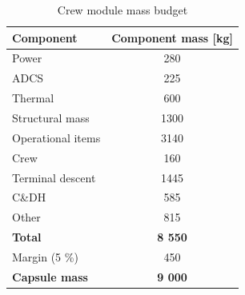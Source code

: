 \begin{table}[ht]
\centering
\caption{Crew module mass budget}
\label{tab:crewmass}
\begin{tabular}{|l|c|}
\hline
{\bf Component}    & {\bf Component mass {[}kg{]}} \\ \hline \hline
Power              & 280                           \\ \hline
 ADCS        &  225                     \\ \hline
Thermal            & 600                           \\ \hline
Structural mass    & 1300                          \\ \hline
Operational items  & 3140                          \\ \hline
Crew               & 160                           \\ \hline
Terminal descent   & 1445                          \\ \hline
C\&DH              & 585                           \\ \hline 
Other    & 815                          \\ \hline \hline
\textbf{Total}    & \textbf{8 550}                          \\ \hline \hline
Margin (5 \%)  & 450                        \\ \hline \hline
{\bf Capsule mass} & {\bf 9 000}                    \\ \hline
\end{tabular}
\end{table}


